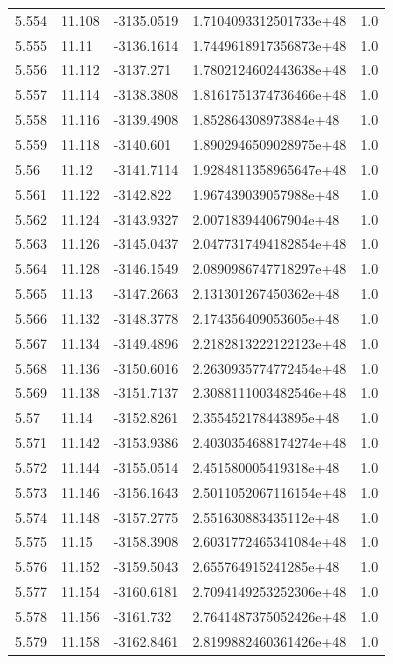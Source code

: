 \begin{tabular}{lllll}
5.554 & 11.108 & -3135.0519 & 1.7104093312501733e+48 & 1.0 \\
5.555 & 11.11 & -3136.1614 & 1.7449618917356873e+48 & 1.0 \\
5.556 & 11.112 & -3137.271 & 1.7802124602443638e+48 & 1.0 \\
5.557 & 11.114 & -3138.3808 & 1.8161751374736466e+48 & 1.0 \\
5.558 & 11.116 & -3139.4908 & 1.852864308973884e+48 & 1.0 \\
5.559 & 11.118 & -3140.601 & 1.8902946509028975e+48 & 1.0 \\
5.56 & 11.12 & -3141.7114 & 1.9284811358965647e+48 & 1.0 \\
5.561 & 11.122 & -3142.822 & 1.967439039057988e+48 & 1.0 \\
5.562 & 11.124 & -3143.9327 & 2.007183944067904e+48 & 1.0 \\
5.563 & 11.126 & -3145.0437 & 2.0477317494182854e+48 & 1.0 \\
5.564 & 11.128 & -3146.1549 & 2.0890986747718297e+48 & 1.0 \\
5.565 & 11.13 & -3147.2663 & 2.131301267450362e+48 & 1.0 \\
5.566 & 11.132 & -3148.3778 & 2.174356409053605e+48 & 1.0 \\
5.567 & 11.134 & -3149.4896 & 2.2182813222122123e+48 & 1.0 \\
5.568 & 11.136 & -3150.6016 & 2.2630935774772454e+48 & 1.0 \\
5.569 & 11.138 & -3151.7137 & 2.3088111003482546e+48 & 1.0 \\
5.57 & 11.14 & -3152.8261 & 2.355452178443895e+48 & 1.0 \\
5.571 & 11.142 & -3153.9386 & 2.4030354688174274e+48 & 1.0 \\
5.572 & 11.144 & -3155.0514 & 2.451580005419318e+48 & 1.0 \\
5.573 & 11.146 & -3156.1643 & 2.5011052067116154e+48 & 1.0 \\
5.574 & 11.148 & -3157.2775 & 2.551630883435112e+48 & 1.0 \\
5.575 & 11.15 & -3158.3908 & 2.6031772465341084e+48 & 1.0 \\
5.576 & 11.152 & -3159.5043 & 2.655764915241285e+48 & 1.0 \\
5.577 & 11.154 & -3160.6181 & 2.7094149253252306e+48 & 1.0 \\
5.578 & 11.156 & -3161.732 & 2.7641487375052426e+48 & 1.0 \\
5.579 & 11.158 & -3162.8461 & 2.8199882460361426e+48 & 1.0 \\

\end{tabular}
